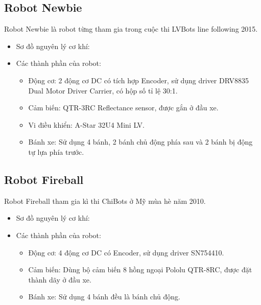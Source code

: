     \subsection{Robot Newbie}
    \hspace*{0.6cm} Robot Newbie là robot từng tham gia trong cuộc thi LVBots line following 2015.
    \begin{itemize}
        \item Sơ đồ nguyên lý cơ khí:
        \item Các thành phần của robot:
            \begin{itemize}[label=\textendash]
                \item Động cơ: 2 động cơ DC có tích hợp Encoder, sử dụng driver DRV8835 Dual Motor Driver Carrier, có hộp số tỉ lệ 30:1.
                \item Cảm biến:  QTR-3RC Reflectance sensor, được gắn ở đầu xe.
                \item Vi điều khiển: 	A-Star 32U4 Mini LV.
                \item Bánh xe: Sử dụng 4 bánh, 2 bánh chủ động phía sau và 2 bánh bị động tự lựa phía trước.
            \end{itemize}
    \end{itemize}



    \subsection{Robot Fireball}
    \hspace*{0.6cm} Robot Fireball tham gia kì thi ChiBots ở Mỹ mùa hè năm 2010.
    \begin{itemize}
        \item Sơ đồ nguyên lý cơ khí:
        \item Các thành phần của robot:
            \begin{itemize}[label=\textendash]
                \item Động cơ: 4 động cơ DC có Encoder, sử dụng driver SN754410.
                \item Cảm biến: Dùng bộ cảm biến 8 hồng ngoại Pololu QTR-8RC, được đặt thành dãy ở đầu xe.
                \item Bánh xe: Sử dụng 4 bánh đều là bánh chủ động.
            \end{itemize}
    \end{itemize}



